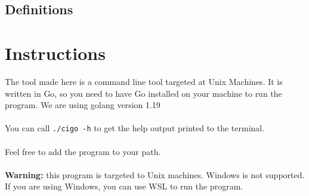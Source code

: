 \documentclass[11pt]{article}
\begin{document}
\subsection{Definitions}

\printglossary[title=\normalsize\vspace*{-1.5\baselineskip}, toctitle=]

\section{Instructions}
The tool made here is a command line tool targeted at Unix Machines. It is written in Go, so you need to have Go installed on your machine to run the program. We are using golang version 1.19
\\\\
You can call \texttt{./cigo -h} to get the help output printed to the terminal.
\\\\
Feel free to add the program to your path.
\\\\
\textbf{Warning:} this program is targeted to Unix machines. Windows is not supported. If you are using Windows, you can use WSL to run the program.
\end{document}
